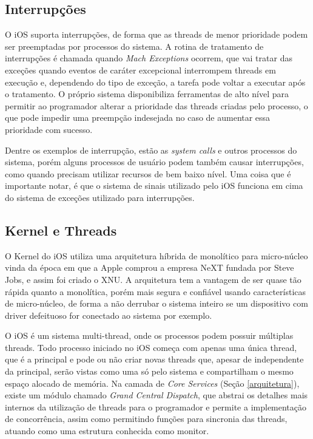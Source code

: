 \documentclass[conference]{IEEEtran}
\begin{document}
\subsection{Interrupções}
O iOS suporta interrupções, de forma que as threads de menor prioridade podem ser preemptadas por processos do sistema. A rotina de tratamento de interrupções é chamada quando \textit{Mach Exceptions} ocorrem, que vai tratar das exceções quando eventos de caráter excepcional interrompem threads em execução e, dependendo do tipo de exceção, a tarefa pode voltar a executar após o tratamento. O próprio sistema disponibiliza ferramentas de alto nível para permitir ao programador alterar a prioridade das threads criadas pelo processo, o que pode impedir uma preempção indesejada no caso de aumentar essa prioridade com sucesso.

Dentre os exemplos de interrupção, estão as \textit{system calls} e outros processos do sistema, porém alguns processos de usuário podem também causar interrupções, como quando precisam utilizar recursos de bem baixo nível. Uma coisa que é importante notar, é que o sistema de sinais utilizado pelo iOS funciona em cima do sistema de exceções utilizado para interrupções. 

\subsection{Kernel e Threads}
O Kernel do iOS utiliza uma arquitetura híbrida de monolítico para micro-núcleo vinda da época em que a Apple comprou a empresa NeXT fundada por Steve Jobs, e assim foi criado o XNU. A arquitetura tem a vantagem de ser quase tão rápida quanto a monolítica, porém mais segura e confiável usando características de micro-núcleo, de forma a não derrubar o sistema inteiro se um dispositivo com driver defeituoso for conectado ao sistema por exemplo.

O iOS é um sistema multi-thread, onde os processos podem possuir múltiplas threads. Todo processo iniciado no iOS começa com apenas uma única thread, que é a principal e pode ou não criar novas threads que, apesar de independente da principal, serão vistas como uma só pelo sistema e compartilham o mesmo espaço alocado de memória. Na camada de \textit{Core Services} (Seção \ref{arquitetura}), existe um módulo chamado \textit{Grand Central Dispatch}, que abstrai os detalhes mais internos da utilização de threads para o programador e permite a implementação de concorrência, assim como permitindo funções para sincronia das threads, atuando como uma estrutura conhecida como monitor.
\end{document}
